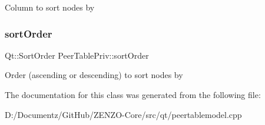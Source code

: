 Column to sort nodes by \mbox{\label{class_peer_table_priv_adb95d4bbc4fb13a21a360108aeca5c32}} 
\subsubsection{\texorpdfstring{sortOrder}{sortOrder}}
{\footnotesize\ttfamily Qt\+::\+Sort\+Order Peer\+Table\+Priv\+::sort\+Order}

Order (ascending or descending) to sort nodes by 

The documentation for this class was generated from the following file\+:\begin{DoxyCompactItemize}
\item 
D\+:/\+Documentz/\+Git\+Hub/\+Z\+E\+N\+Z\+O-\/\+Core/src/qt/peertablemodel.\+cpp\end{DoxyCompactItemize}
